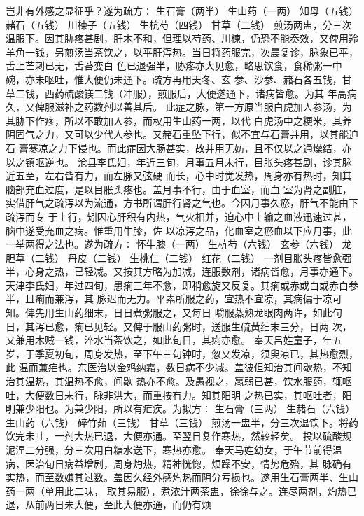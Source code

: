 \documentclass[a4paper,12pt,UTF8,twoside]{ctexbook}
\begin{document}
岂非有外感之显征乎？遂为疏方∶ 
生石膏（两半） 生山药（一两） 知母（五钱） 赭石（五钱） 
川楝子（五钱） 生杭芍（四钱） 甘草（二钱） 
煎汤两盅，分三次温服下。因其胁疼甚剧，肝木不和，但理以芍药、川楝，仍恐不能奏效，又俾用羚 
羊角一钱，另煎汤当茶饮之，以平肝泻热。当日将药服完，次晨复诊，脉象已平，舌上芒刺已无，舌苔变白 
色已退强半，胁疼亦大见愈，略思饮食，食稀粥一中碗，亦未呕吐，惟大便仍未通下。疏方再用天冬、玄 
参、沙参、赭石各五钱，甘草二钱，西药硫酸镁二钱（冲服），煎服后，大便遂通下，诸病皆愈。为其 
年高病久，又俾服滋补之药数剂以善其后。 
此症之脉，第一方原当服白虎加人参汤，为其胁下作疼，所以不敢加人参，而权用生山药一两，以代 
白虎汤中之粳米，其养阴固气之力，又可以少代人参也。又赭石重坠下行，似不宜与石膏并用，以其能迫石 
膏寒凉之力下侵也。而此症因大肠甚实，故并用无妨，且不仅以之通燥结，亦以之镇呕逆也。 
沧县李氏妇，年近三旬，月事五月未行，目胀头疼甚剧，诊其脉近五至，左右皆有力，而左脉又弦硬 
而长，心中时觉发热，周身亦有热时，知其脑部充血过度，是以目胀头疼也。盖月事不行，由于血室，而血 
室为肾之副脏，实借肝气之疏泻以为流通，方书所谓肝行肾之气也。今因月事久瘀，肝气不能由下疏泻而专 
于上行，矧因心肝积有内热，气火相并，迫心中上输之血液迅速过甚，脑中遂受充血之病。惟重用牛膝，佐 
以凉泻之品，化血室之瘀血以下应月事，此一举两得之法也。遂为疏方∶ 
怀牛膝（一两） 生杭芍（六钱） 玄参（六钱） 龙胆草（二钱） 
丹皮（二钱） 生桃仁（二钱） 红花（二钱） 
一剂目胀头疼皆愈强半，心身之热，已轻减。又按其方略为加减，连服数剂，诸病皆愈，月事亦通下。 
天津李氏妇，年过四旬，患痢三年不愈，即稍愈旋又反复。其痢或赤或白或赤白参半，且痢而兼泻，其 
脉迟而无力。平素所服之药，宜热不宜凉，其病偏于凉可知。俾先用生山药细末，日日煮粥服之，又每日 
嚼服蒸熟龙眼肉两许，如此旬日，其泻已愈，痢已见轻。又俾于服山药粥时，送服生硫黄细末三分，日两 
次，又兼用木贼一钱，淬水当茶饮之，如此旬日，其痢亦愈。 
奉天吕姓童子，年五岁，于季夏初旬，周身发热，至下午三句钟时，忽又发凉，须臾凉已，其热愈烈，此 
温而兼疟也。东医治以金鸡纳霜，数日病不少减。盖彼但知治其间歇热，不知治其温热，其温热不愈，间歇 
热亦不愈。及愚视之，羸弱已甚，饮水服药，辄呕吐，大便数日未行，脉非洪大，而重按有力。知其阳明 
之热已实，其呕吐者，阳明兼少阳也。为兼少阳，所以有疟疾。为拟方∶ 
生石膏（三两） 生赭石（六钱） 生山药（六钱） 碎竹茹（三钱） 甘草（三钱） 
煎汤一盅半，分三次温饮下。将药饮完未吐，一剂大热已退，大便亦通。至翌日复作寒热，然较轻矣。 
投以硫酸规泥涅二分强，分三次用白糖水送下，寒热亦愈。 
奉天马姓幼女，于午节前得温病，医治旬日病益增剧，周身灼热，精神恍惚，烦躁不安，情势危殆，其 
脉确有实热，而至数嫌其过数。盖因久经外感灼热而阴分亏损也。遂用生石膏两半、生山药一两（单用此二味， 
取其易服），煮浓汁两茶盅，徐徐与之。连尽两剂，灼热已退，从前两日未大便，至此大便亦通，而仍有烦 
\end{document}
